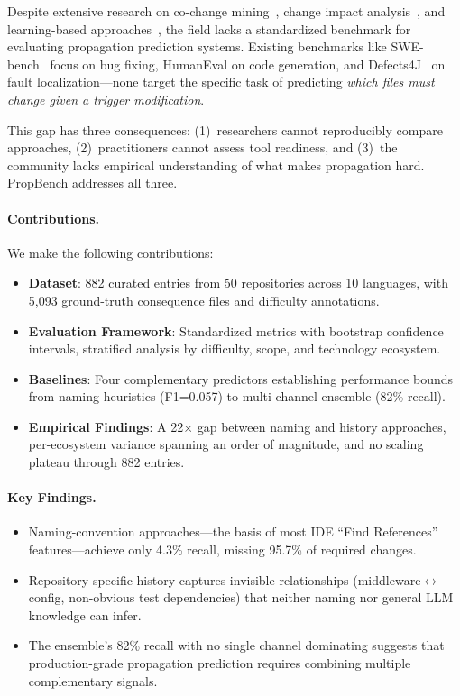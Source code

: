 \documentclass[sigconf,nonacm]{acmart}
\begin{document}
Despite extensive research on co-change mining~\cite{zimmermann2005,ying2004,gall1998}, change impact analysis~\cite{robillard2005,canfora2014}, and learning-based approaches~\cite{das2016,chen2021}, the field lacks a standardized benchmark for evaluating propagation prediction systems. Existing benchmarks like SWE-bench~\cite{jimenez2023} focus on bug fixing, HumanEval on code generation, and Defects4J~\cite{just2014} on fault localization---none target the specific task of predicting \emph{which files must change given a trigger modification}.

This gap has three consequences: (1)~researchers cannot reproducibly compare approaches, (2)~practitioners cannot assess tool readiness, and (3)~the community lacks empirical understanding of what makes propagation hard. PropBench addresses all three.

\paragraph{Contributions.} We make the following contributions:
\begin{itemize}
    \item \textbf{Dataset}: 882 curated entries from 50 repositories across 10 languages, with 5{,}093 ground-truth consequence files and difficulty annotations.
    \item \textbf{Evaluation Framework}: Standardized metrics with bootstrap confidence intervals, stratified analysis by difficulty, scope, and technology ecosystem.
    \item \textbf{Baselines}: Four complementary predictors establishing performance bounds from naming heuristics (F1=0.057) to multi-channel ensemble (82\% recall).
    \item \textbf{Empirical Findings}: A 22$\times$ gap between naming and history approaches, per-ecosystem variance spanning an order of magnitude, and no scaling plateau through 882 entries.
\end{itemize}

\paragraph{Key Findings.}
\begin{itemize}
    \item Naming-convention approaches---the basis of most IDE ``Find References'' features---achieve only 4.3\% recall, missing 95.7\% of required changes.
    \item Repository-specific history captures invisible relationships (middleware$\leftrightarrow$config, non-obvious test dependencies) that neither naming nor general LLM knowledge can infer.
    \item The ensemble's 82\% recall with no single channel dominating suggests that production-grade propagation prediction requires combining multiple complementary signals.
\end{itemize}
\end{document}
